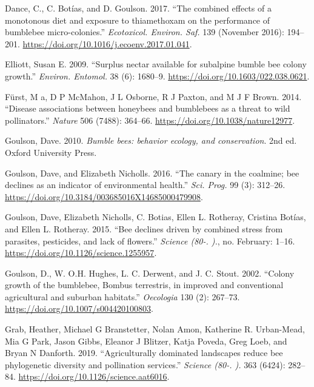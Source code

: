 \documentclass[11pt,]{article}
\begin{document}
\leavevmode\hypertarget{ref-Dance2017}{}%
Dance, C., C. Botías, and D. Goulson. 2017. ``The combined effects of a
monotonous diet and exposure to thiamethoxam on the performance of
bumblebee micro-colonies.'' \emph{Ecotoxicol. Environ. Saf.} 139
(November 2016): 194--201.
\url{https://doi.org/10.1016/j.ecoenv.2017.01.041}.

\leavevmode\hypertarget{ref-Elliott2009}{}%
Elliott, Susan E. 2009. ``Surplus nectar available for subalpine bumble
bee colony growth.'' \emph{Environ. Entomol.} 38 (6): 1680--9.
\url{https://doi.org/10.1603/022.038.0621}.

\leavevmode\hypertarget{ref-Furst2014}{}%
Fürst, M a, D P McMahon, J L Osborne, R J Paxton, and M J F Brown. 2014.
``Disease associations between honeybees and bumblebees as a threat to
wild pollinators.'' \emph{Nature} 506 (7488): 364--66.
\url{https://doi.org/10.1038/nature12977}.

\leavevmode\hypertarget{ref-Goulson2008}{}%
Goulson, Dave. 2010. \emph{Bumble bees: behavior ecology, and
conservation}. 2nd ed. Oxford University Press.

\leavevmode\hypertarget{ref-Goulson2016}{}%
Goulson, Dave, and Elizabeth Nicholls. 2016. ``The canary in the
coalmine; bee declines as an indicator of environmental health.''
\emph{Sci. Prog.} 99 (3): 312--26.
\url{https://doi.org/10.3184/003685016X14685000479908}.

\leavevmode\hypertarget{ref-Goulson2015c}{}%
Goulson, Dave, Elizabeth Nicholls, C. Botias, Ellen L. Rotheray,
Cristina Botías, and Ellen L. Rotheray. 2015. ``Bee declines driven by
combined stress from parasites, pesticides, and lack of flowers.''
\emph{Science (80-. ).}, no. February: 1--16.
\url{https://doi.org/10.1126/science.1255957}.

\leavevmode\hypertarget{ref-Goulson2002c}{}%
Goulson, D., W. O.H. Hughes, L. C. Derwent, and J. C. Stout. 2002.
``Colony growth of the bumblebee, Bombus terrestris, in improved and
conventional agricultural and suburban habitats.'' \emph{Oecologia} 130
(2): 267--73. \url{https://doi.org/10.1007/s004420100803}.

\leavevmode\hypertarget{ref-Grab2019}{}%
Grab, Heather, Michael G Branstetter, Nolan Amon, Katherine R.
Urban-Mead, Mia G Park, Jason Gibbs, Eleanor J Blitzer, Katja Poveda,
Greg Loeb, and Bryan N Danforth. 2019. ``Agriculturally dominated
landscapes reduce bee phylogenetic diversity and pollination services.''
\emph{Science (80-. ).} 363 (6424): 282--84.
\url{https://doi.org/10.1126/science.aat6016}.
\end{document}
